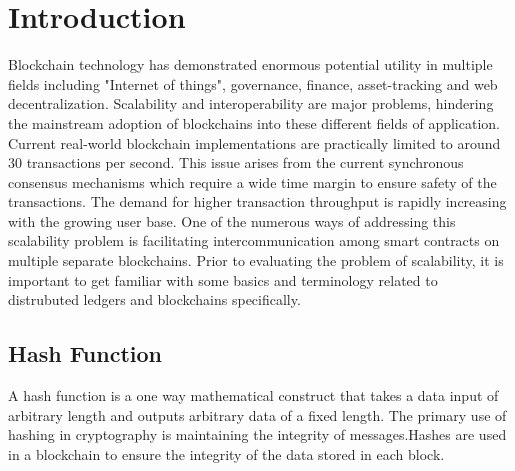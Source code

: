 \documentclass[a4paper,twoside,phd]{BYUPhys}
\begin{document}
 \frontmatter


 \makepreliminarypages


\doublespace
%

%

 \clearemptydoublepage
\singlespace
 \tableofcontents

\clearemptydoublepage
\listoffigures

\clearemptydoublepage
\listoftables

\clearemptydoublepage

\mainmatter
%
\chapter{Introduction}
\label{chap:Introduction}
Blockchain technology has demonstrated enormous potential utility in multiple fields including "Internet of things", governance, finance, asset-tracking and web decentralization. 
 Scalability and interoperability are major problems, hindering the mainstream adoption of blockchains into these different fields of application. Current real-world blockchain implementations are practically limited to around 30 transactions per second. This issue arises from the current synchronous consensus mechanisms which require a wide time margin to ensure safety of the transactions. The demand for higher transaction throughput is rapidly increasing with the growing user base. One of the numerous ways of addressing this scalability problem is facilitating intercommunication among smart contracts on multiple separate blockchains. Prior to evaluating the problem of scalability, it is important to get familiar with some basics and terminology related to distrubuted ledgers and blockchains specifically.


\section{Hash Function}
A hash function is a one way mathematical construct that takes a data input of arbitrary length and outputs arbitrary data of a fixed length. The primary use of hashing in cryptography is maintaining the integrity of messages.Hashes are used in a blockchain to ensure the integrity of the data stored in each block.
\end{document}
